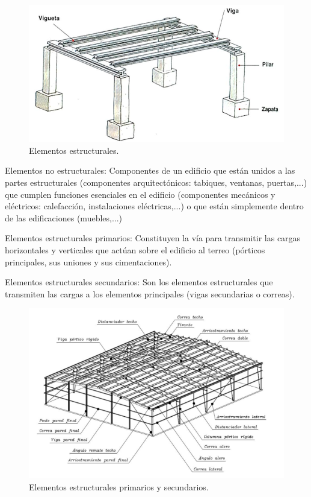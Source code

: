 \begin{figure}[h]
    \centering
    \includegraphics[width=0.75\linewidth]{Imagenes/Elementos estructurales.png}
    \caption{Elementos estructurales.}
\end{figure}

Elementos no estructurales: Componentes de un edificio que están unidos a las partes estructurales (componentes arquitectónicos: tabiques, ventanas, puertas,...) que cumplen funciones esenciales en el edificio (componentes mecánicos y eléctricos: calefacción, instalaciones eléctricas,...) o que están simplemente dentro de las edificaciones (muebles,...)

Elementos estructurales primarios: Constituyen la vía para transmitir las cargas horizontales y verticales que actúan sobre el edificio al terreo (pórticos principales, sus uniones y sus cimentaciones).

Elementos estructurales secundarios: Son los elementos estructurales que transmiten las cargas a los elementos principales (vigas secundarias o correas).

\begin{figure}[h]
    \centering
    \includegraphics[width=0.75\linewidth]{Imagenes/Elementos estructurales (1).png}
    \caption{Elementos estructurales primarios y secundarios.}
\end{figure}

